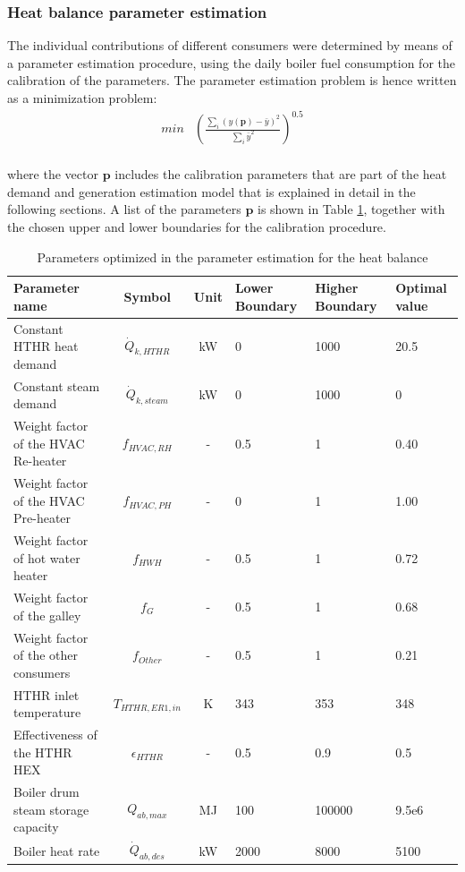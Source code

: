 \documentclass[preprint,12pt]{elsarticle}
\begin{document}
	
\subsubsection{Heat balance parameter estimation}
	
The individual contributions of different consumers were determined by means of a parameter estimation procedure, using the daily boiler fuel consumption for the calibration of the parameters. The parameter estimation problem is hence written as a minimization problem:
\begin{eqnarray}
min &  \left(\frac{\sum_i(y(\textbf{p})-\bar{y})^2}{\sum_i \bar{y}^2}\right)^{0.5} \\
\end{eqnarray}
	
where the vector $\textbf{p}$ includes the calibration parameters that are part of the heat demand and generation estimation model that is explained in detail in the following sections. A list of the parameters $\textbf{p}$ is shown in Table \ref{tab:ParameterEstimation}, together with the chosen upper and lower boundaries for the calibration procedure.
\begin{table}
	\centering
	\begin{tabular}{p{3cm}ccp{1.6cm}p{1.6cm}p{1.2cm}}
		\hline 
		Parameter name & Symbol  & Unit & Lower Boundary & Higher Boundary & Optimal value \\ 
		\hline
		Constant HTHR heat demand	 & $\dot{Q}_{k,HTHR}$ & kW & 0 & 1000 & 20.5 \\ 
		Constant steam demand		 & $\dot{Q}_{k,steam}$ & kW & 0 & 1000 & 0 \\
		Weight factor of the HVAC Re-heater & $f_{HVAC,RH}$ & - & 0.5 & 1 & 0.40 \\ 
		Weight factor of the HVAC Pre-heater & $f_{HVAC,PH}$ & - & 0 & 1 & 1.00 \\ 
		Weight factor of hot water heater & $f_{HWH}$ & - & 0.5 & 1 & 0.72 \\ 
		Weight factor of the galley & $f_{G}$ & - & 0.5 & 1 & 0.68 \\ 
		Weight factor of the other consumers & $f_{Other}$ & - & 0.5 & 1 & 0.21 \\ 
		HTHR inlet temperature & $T_{HTHR,ER1,in}$ & K & 343 & 353 & 348 \\
		Effectiveness of the HTHR HEX & $\epsilon_{HTHR} $ & - & 0.5 & 0.9 & 0.5 \\
		Boiler drum steam storage capacity & $Q_{ab,max}$ & MJ & 100 & 100000 & 9.5e6 \\ 
		Boiler heat rate & $\dot{Q}_{ab,des}$ & kW & 2000 & 8000 & 5100 \\ 
		\hline
	\end{tabular}
	\caption{Parameters optimized in the parameter estimation for the heat balance}
	\label{tab:ParameterEstimation} 
\end{table}
	
\end{document}

